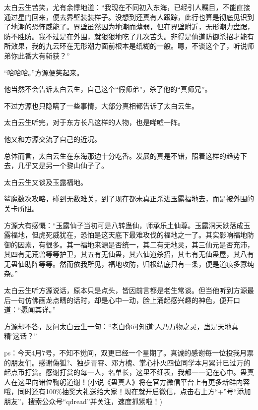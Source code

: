 \begin{this_body}
太白云生苦笑，尤有余悸地道：“我现在不同初入东海，已经引人瞩目，不能直接通过星门回来，便去界壁装装样子。没想到还真有人跟踪，此行也算是彻底见识到了地潮的恐怖威能了。界壁虽然因为地潮而薄弱，但在界壁附近，无形潮力盘踞，防不胜防。我不过是在外围，就狠狠地吃了几次苦头。非得是仙道防御杀招才能有所效果，我的九云环在无形潮力面前根本是纸糊的一般。嗯，不谈这个了，听说师弟你此番大有斩获？”

“哈哈哈。”方源便笑起来。

他当然不会告诉太白云生，自己这个“假师弟”，杀了他的“真师兄”。

不过方源也只隐瞒了一些事情，大部分真相都告诉了太白云生。

太白云生听完，对于东方长凡这样的人物，也是唏嘘一阵。

他又和方源交流了自己的近况。

总体而言，太白云生在东海那边十分吃香。发展的真是不错，照着这样的趋势下去，几乎又是另一个黎山仙子了。

太白云生又谈及玉露福地。

鲨魔数次攻略，碰到无数难关，到了现在都未真正杀进玉露福地去，而是被外围的关卡所阻。

方源大有感慨：“玉露仙子当初可是八转蛊仙，师承乐土仙尊。玉露洞天跌落成玉露福地，但虎死威犹在，恐怕是这天底下最难攻伐的福地之一了。其实影响福地防御的因素，有很多。其一福地来源是否统一，其二有无地灵，其三仙元是否充沛，其四有无荒兽等等护卫，其五有无仙蛊，其六仙道杀招，其七有无仙蛊屋，其八有无蛊仙助阵等等。然而依我所见，福地攻防，归根结底只有一条，便是道痕多寡纯杂。”

太白云生听方源说话，原本只是点头，皆因前言都是老生常谈。但当他听到方源最后一句仿佛画龙点睛的话时，却是心中一动，脸上涌起感兴趣的神色，便开口道：“愿闻其详。”

方源却不答，反问太白云生一句：“老白你可知道‘人乃万物之灵，蛊是天地真精’这话？”

ps：今天4月7号，不知不觉间，双更已经一个星期了。真诚的感谢每一位投我月票的朋友们。感谢偽狐?、独步青霄、邓方槐、掌心扑火四位同学本月累计已过万的起点币打赏。感谢打赏的每一人，名单长，这里不细表，我都一一记在心中。蛊真人在这里向诸位鞠躬道谢！(小说《蛊真人》将在官方微信平台上有更多新鲜内容哦，同时还有100\%抽奖大礼送给大家！现在就开启微信，点击右上方“+”号“添加朋友”，搜索公众号“qdread”并关注，速度抓紧啦！)

\end{this_body}

